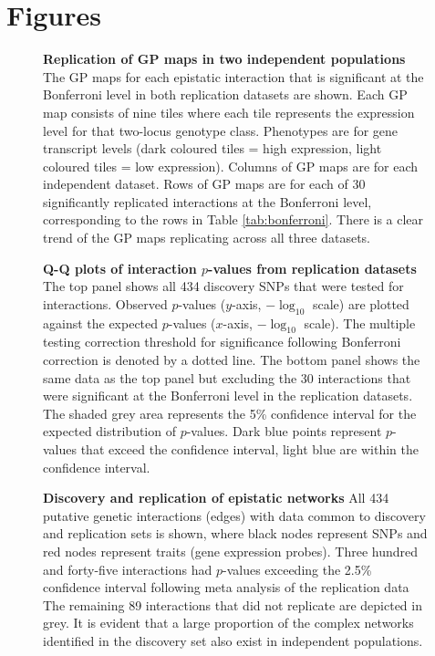 \documentclass{article}
\begin{document}
\clearpage
\section*{Figures}

\begin{figure}[H]
	\centering
	\caption{\textbf{Replication of GP maps in two independent populations} The GP maps for each epistatic interaction that is significant at the Bonferroni level in both replication datasets are shown. Each GP map consists of nine tiles where each tile represents the expression level for that two-locus genotype class. Phenotypes are for gene transcript levels (dark coloured tiles = high expression, light coloured tiles = low expression). Columns of GP maps are for each independent dataset. Rows of GP maps are for each of 30 significantly replicated interactions at the Bonferroni level, corresponding to the rows in Table \ref{tab:bonferroni}. There is a clear trend of the GP maps replicating across all three datasets.}
	\label{fig:gpmaps}
\end{figure}

\begin{figure}[H]
	\centering
	\caption{\textbf{Q-Q plots of interaction $p$-values from replication datasets} The top panel shows all 434 discovery SNPs that were tested for interactions. Observed $p$-values ($y$-axis, $-\log_{10}$ scale) are plotted against the expected $p$-values ($x$-axis, $-\log_{10}$ scale). The multiple testing correction threshold for significance following Bonferroni correction is denoted by a dotted line. The bottom panel shows the same data as the top panel but excluding the 30 interactions that were significant at the Bonferroni level in the replication datasets. The shaded grey area represents the 5\% confidence interval for the expected distribution of $p$-values. Dark blue points represent $p$-values that exceed the confidence interval, light blue are within the confidence interval.}
	\label{fig:qqMeta}
\end{figure}

\begin{figure}[H]
	\centering
	\caption{\textbf{Discovery and replication of epistatic networks} All 434 putative genetic interactions (edges) with data common to discovery and replication sets is shown, where black nodes represent SNPs and red nodes represent traits (gene expression probes). Three hundred and forty-five interactions had $p$-values exceeding the 2.5\% confidence interval following meta analysis of the replication data The remaining 89 interactions that did not replicate are depicted in grey. It is evident that a large proportion of the complex networks identified in the discovery set also exist in independent populations.}
	\label{fig:fireworks}
\end{figure}
\end{document}
